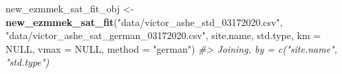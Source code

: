 \documentclass[
]{article}
\newenvironment{Shaded}{\begin{snugshade}}{\end{snugshade}}
\newcommand{\CommentTok}[1]{\textcolor[rgb]{0.56,0.35,0.01}{\textit{#1}}}
\newcommand{\DataTypeTok}[1]{\textcolor[rgb]{0.13,0.29,0.53}{#1}}
\newcommand{\KeywordTok}[1]{\textcolor[rgb]{0.13,0.29,0.53}{\textbf{#1}}}
\newcommand{\NormalTok}[1]{#1}
\newcommand{\OtherTok}[1]{\textcolor[rgb]{0.56,0.35,0.01}{#1}}
\newcommand{\StringTok}[1]{\textcolor[rgb]{0.31,0.60,0.02}{#1}}
\begin{document}
\begin{Shaded}
\begin{Highlighting}[]
\NormalTok{new\_ezmmek\_sat\_fit\_obj <{-}}\StringTok{ }\KeywordTok{new\_ezmmek\_sat\_fit}\NormalTok{(}\StringTok{"data/victor\_ashe\_std\_03172020.csv"}\NormalTok{, }
                                     \StringTok{"data/victor\_ashe\_sat\_german\_03172020.csv"}\NormalTok{, }
\NormalTok{                                     site.name, }
\NormalTok{                                     std.type,}
                                     \DataTypeTok{km =} \OtherTok{NULL}\NormalTok{,}
                                     \DataTypeTok{vmax =} \OtherTok{NULL}\NormalTok{,}
                                     \DataTypeTok{method =} \StringTok{"german"}\NormalTok{)}
\CommentTok{\#> Joining, by = c("site.name", "std.type")}


\end{Highlighting}
\end{Shaded}
\end{document}
